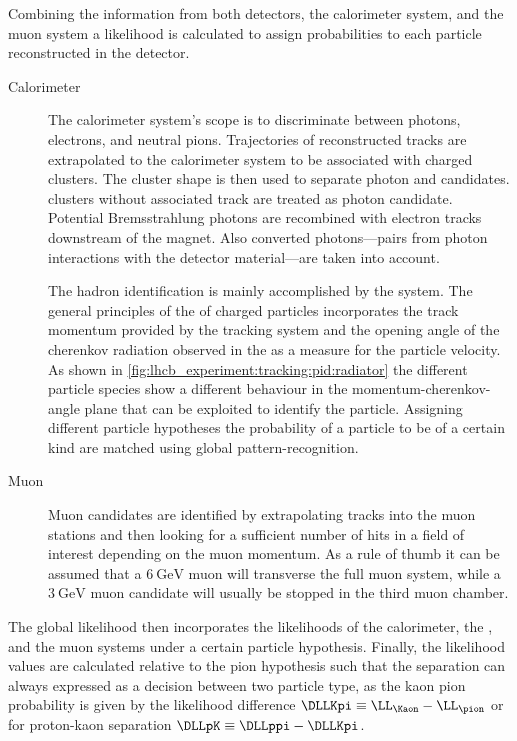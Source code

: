 Combining the information from both \RICH detectors, the calorimeter system, and
the muon system a likelihood is calculated to assign \PID probabilities to each
particle reconstructed in the detector.
%
\begin{description}
  \item[Calorimeter \PID] The calorimeter system's scope is to discriminate
  between photons, electrons, and neutral pions. Trajectories of reconstructed
  tracks are extrapolated to the calorimeter system to be associated with
  charged clusters. The cluster shape is then used to separate photon and \piz
  candidates. \ECAL clusters without associated track are treated as photon
  candidate. Potential Bremsstrahlung photons are recombined with electron
  tracks downstream of the magnet. Also converted photons---\elel pairs from
  photon interactions with the detector material---are taken into account.
  \item[\RICH \PID] The hadron identification is mainly accomplished by the
  \RICH system. The general principles of the \RICH \PID of charged particles
  incorporates the track momentum provided by the tracking system and the
  opening angle of the cherenkov radiation observed in the \RICH as a measure
  for the particle velocity. As shown in
  \cref{fig:lhcb_experiment:tracking:pid:radiator} the different particle
  species show a different behaviour in the momentum-cherenkov-angle plane that
  can be exploited to identify the particle. Assigning different particle
  hypotheses the probability of a particle to be of a certain kind are matched
  using global pattern-recognition.
  \item[Muon \PID] Muon candidates are identified by extrapolating tracks into
  the muon stations and then looking for a sufficient number of hits in a field
  of interest depending on the muon momentum. As a rule of thumb it can be
  assumed that a $\SI{6}{\GeV}$ muon will transverse the full muon system, while
  a $\SI{3}{\GeV}$ muon candidate will usually be stopped in the third muon
  chamber.
\end{description}
%
The global \PID likelihood then incorporates the likelihoods of the calorimeter,
the \RICH, and the muon systems under a certain particle hypothesis. Finally,
the likelihood values are calculated relative to the pion hypothesis such that
the separation can always expressed as a decision between two particle type, as
\eg the kaon \vs pion probability is given by the likelihood difference $\DLLKpi
\equiv \LL_{\Kaon} - \LL_{\pion}$ or for proton-kaon separation $\DLLpK \equiv
\DLLppi - \DLLKpi$.

